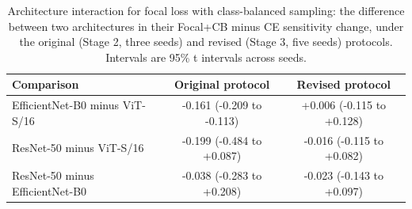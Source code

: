 \documentclass[11pt]{article}
\begin{document}
\begin{table}[t]
\centering
\small
\caption{Effect of focal loss with class-balanced sampling under the original protocol (Stage 2: shared learning rate, checkpoint by validation balanced accuracy at 0.5, three seeds) and the revised protocol (Stage 3: per-architecture learning rate, checkpoint by validation AUC, five seeds). Sensitivity is at the validation-selected 95\% specificity threshold. Intervals are 95\% t intervals across seeds.}
\label{tab:protocol}
\end{table}

\begin{table}[t]
\centering
\small
\caption{Architecture interaction for focal loss with class-balanced sampling: the difference between two architectures in their Focal+CB minus CE sensitivity change, under the original (Stage 2, three seeds) and revised (Stage 3, five seeds) protocols. Intervals are 95\% t intervals across seeds.}
\label{tab:interaction}
\begin{tabular}{lcc}
\toprule
Comparison & Original protocol & Revised protocol \\
\midrule
EfficientNet-B0 minus ViT-S/16 & -0.161 (-0.209 to -0.113) & +0.006 (-0.115 to +0.128) \\
ResNet-50 minus ViT-S/16 & -0.199 (-0.484 to +0.087) & -0.016 (-0.115 to +0.082) \\
ResNet-50 minus EfficientNet-B0 & -0.038 (-0.283 to +0.208) & -0.023 (-0.143 to +0.097) \\
\bottomrule
\end{tabular}
\end{table}
\end{document}

